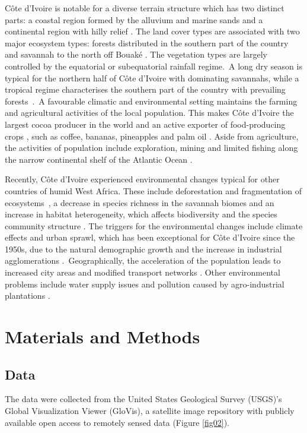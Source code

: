 \documentclass[jimaging,article,accept,pdftex,moreauthors]{Definitions/mdpi}
\begin{document}
C\^ote d'Ivoire is notable for {a} diverse terrain structure which has two distinct parts: a coastal region formed by the alluvium and marine sands and a continental region with hilly relief \cite{Thomasset}. The land cover types are associated with two major ecosystem types: forests{ }distributed{ }in the southern part of the country{ }and savannah to the north off Bouak\'{e} \cite{Rougerie}. The vegetation types are largely controlled by the equatorial or subequatorial rainfall regime.~A long dry season is typical for the northern half of Côte d'Ivoire with dominating savannahs, while a tropical regime characterises the southern part of the country with prevailing forests~\cite{Tricart}.~A favourable climatic and environmental setting maintains the farming and agricultural activities {of the local population. This makes} Côte d'Ivoire the largest cocoa producer in the world \cite{Losch,Planhol,Smithetal2014,Laderach} and an active exporter of food-producing crops \cite{Sawadogo}, such as coffee, bananas, pineapples and palm oil \cite{Pelissier}. Aside from agriculture, the activities of population include exploration, mining \cite{SAKO2018297,SAUERWEIN2020104323,MURRAY2019351} and limited fishing along the narrow continental shelf of the Atlantic Ocean \cite{Sournia}. 

Recently, Côte d'Ivoire {experienced} environmental changes{ typical for other countries of} humid West Africa{. These }include deforestation and fragmentation of ecosystems~\cite{Chatelain}, a decrease in species richness in the savannah biomes \cite{Kolongo} and an increase in habitat heterogeneity, which affects biodiversity and the species community structure \cite{Yeo}. {The triggers for the environmental changes include} climate effects {and} urban sprawl, {which} has been exceptional for Côte d'Ivoire since the 1950s, due to the natural demographic growth and the {increase in} industrial agglomerations \cite{Dubresson,Chaleard,Cotten1974,Cotten1973}.~Geographically, {the} acceleration of the population {leads to} increased city areas and modified transport networks \cite{Cotten1985}. Other environmental problems include water supply issues and pollution caused by agro-industrial plantations \cite{Doumouya}. 

\section{Materials and Methods}

\subsection{Data}
The data were collected from the United States Geological Survey (USGS)'s Global Visualization Viewer (GloVis), a satellite image repository with {publicly available} open access to remotely sensed data (Figure \ref{fig02}). 
\end{document}
